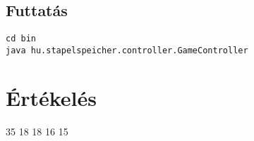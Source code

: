 \subsection{Futtatás}

\lstset{escapeinside=`', xleftmargin=10pt, frame=single, basicstyle=\ttfamily\footnotesize, language=sh}
\begin{lstlisting}
cd bin
java hu.stapelspeicher.controller.GameController
\end{lstlisting}

\section{Értékelés}

\begin{ertekeles}
{35}        %
{18}
{18}
{16}
{15}
\end{ertekeles}

